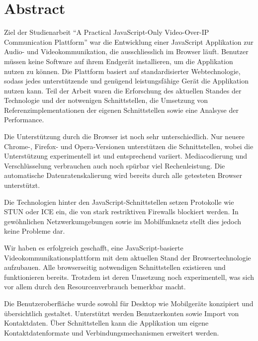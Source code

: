 \chapter{Abstract}

Ziel der Studienarbeit ``A Practical JavaScript-Only Video-Over-IP Communication Plattform'' war die Entwicklung einer JavaScript Applikation zur Audio- und Videokommunikation, die ausschliesslich im Browser läuft. Benutzer müssen keine Software auf ihrem Endgerät installieren, um die Applikation nutzen zu können. Die Plattform basiert auf standardisierter Webtechnologie, sodass jedes unterstützende und genügend leistungsfähige Gerät die Applikation nutzen kann.
Teil der Arbeit waren die Erforschung des aktuellen Standes der Technologie und der notwenigen Schnittstellen, die Umsetzung von Referenzimplementationen der eigenen Schnittstellen sowie eine Analsyse der Performance.

Die Unterstützung durch die Browser ist noch sehr unterschiedlich. Nur neuere Chrome-, Firefox- und Opera-Versionen unterstützen die Schnittstellen, wobei die Unterstützung experimentell ist und entsprechend variiert. Mediacodierung und Verschlüsselung verbrauchen auch noch spürbar viel Rechenleistung. Die automatische Datenratenskalierung wird bereits durch alle getesteten Browser unterstützt.

Die Technologien hinter den JavaScript-Schnittstellen setzen Protokolle wie STUN oder ICE ein, die von stark restriktiven Firewalls blockiert werden. In gewöhnlichen Netzwerkumgebungen sowie im Mobilfunknetz stellt dies jedoch keine Probleme dar. 

Wir haben es erfolgreich geschafft, eine JavaScript-basierte Videokommunikationsplattform mit dem aktuellen Stand der Browsertechnologie aufzubauen. Alle browserseitig notwendigen Schnittstellen existieren und funktionieren bereits. Trotzdem ist deren Umsetzung noch experimentell, was sich vor allem durch den Resourcenverbrauch bemerkbar macht.

Die Benutzeroberfläche wurde sowohl für Desktop wie Mobilgeräte konzipiert und übersichtlich gestaltet. Unterstützt werden Benutzerkonten sowie Import von Kontaktdaten.
Über Schnittstellen kann die Applikation um eigene Kontaktdatenformate und Verbindungsmechanismen erweitert werden.